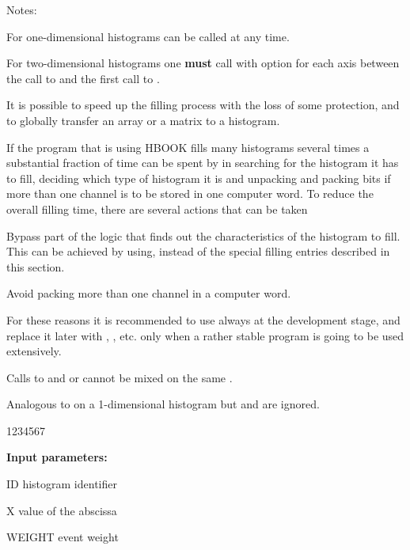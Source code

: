 Notes:
\begin{UL}
\item For one-dimensional histograms  can be called at any time.
\item For two-dimensional histograms one {\bf must} call 
      with option  for each axis between the call to 
      and the first call to .
\end{UL}

\newpage%

\label{HOTHFILL}

It is possible to speed up the filling process with the loss 
of some protection,
and to globally transfer an array or a matrix to a histogram.

\label{HFASTFIL}
 
If the program that is using HBOOK fills many histograms several
times a substantial fraction of time can be spent by 
in searching for the histogram it has to fill, deciding which type
of histogram
it is and unpacking and packing bits if more than one channel is to
be stored in one computer word.
To reduce the overall filling time, there are several actions
that can be taken
 
\begin{UL}
\item Bypass part of the logic that finds out the characteristics
of the histogram to fill. This can be achieved by using,
instead of 
the special filling entries described in this section.
\item Avoid packing more than one channel in a computer word.
\end{UL}
 
For these reasons it is recommended to use always 
at the development stage, and replace it later with
, , etc. only when a rather 
stable program is going to be used extensively.
 
Calls to  and  or 
cannot be mixed on the same .
\medskip
 
 
\Action Analogous to  on a 1-dimensional histogram
but  and  are ignored.
 
\begin{DLtt}{1234567}
\item[{\rm\bf Input parameters:}]
\item[ID] histogram identifier
\item[X] value of the abscissa
\item[WEIGHT] event weight
\end{DLtt}
 

